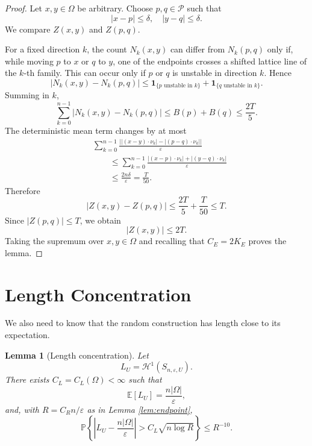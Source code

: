 \documentclass[11pt]{article}
\newtheorem{lemma}[theorem]{Lemma}
\newcommand{\E}{\mathbb E}
\newcommand{\Prob}{\mathbb P}
\newcommand{\cH}{\mathcal H}
\newcommand{\eps}{\varepsilon}
\begin{document}
\begin{proof}
\bigskip
\noindent
Let $x,y\in\Omega$ be arbitrary. Choose $p,q\in\mathcal P$ such that
\[
        |x-p|\le\delta,
        \quad
        |y-q|\le\delta.
\]
We compare $Z(x,y)$ and $Z(p,q)$.

\bigskip
\noindent
For a fixed direction $k$, the count $N_k(x,y)$ can differ from $N_k(p,q)$ only if, while moving $p$ to $x$ or $q$ to $y$, one of the endpoints crosses a shifted lattice line of the $k$-th family. This can occur only if $p$ or $q$ is unstable in direction $k$. Hence
\[
        |N_k(x,y)-N_k(p,q)|
        \le
        \mathbf 1_{\{p\text{ unstable in }k\}}
        +
        \mathbf 1_{\{q\text{ unstable in }k\}}.
\]
Summing in $k$,
\[
        \sum_{k=0}^{n-1}
        |N_k(x,y)-N_k(p,q)|
        \le
        B(p)+B(q)
        \le
        \frac{2T}{5}.
\]
The deterministic mean term changes by at most
\[
\begin{aligned}
        &
        \sum_{k=0}^{n-1}
        \frac{
        \left|
        |(x-y)\cdot\nu_k|
        -
        |(p-q)\cdot\nu_k|
        \right|
        }{\eps}  \\
        &\qquad\le
        \sum_{k=0}^{n-1}
        \frac{
        |(x-p)\cdot\nu_k|+|(y-q)\cdot\nu_k|
        }{\eps}  \\
        &\qquad\le
        \frac{2n\delta}{\eps}
        =
        \frac{T}{50}.
\end{aligned}
\]
Therefore
\[
        |Z(x,y)-Z(p,q)|
        \le
        \frac{2T}{5}+\frac{T}{50}
        \le
        T.
\]
Since $|Z(p,q)|\le T$, we obtain
\[
        |Z(x,y)|\le 2T.
\]
Taking the supremum over $x,y\in\Omega$ and recalling that $C_E=2K_E$ proves the lemma.
\end{proof}

\section{Length Concentration}

We also need to know that the random construction has length close to its expectation.

\begin{lemma}[Length concentration]\label{lem:length}
Let
\[
        L_U=\cH^1(S_{n,\eps,U}).
\]
There exists $C_L=C_L(\Omega)<\infty$ such that
\[
        \E \left[L_U\right]=\frac{n|\Omega|}{\eps},
\]
and, with $R=C_R n/\eps$ as in Lemma \ref{lem:endpoint},
\[
        \Prob\left\{
        \left|
        L_U-\frac{n|\Omega|}{\eps}
        \right|
        >
        C_L\sqrt{n\log R}
        \right\}
        \le
        R^{-10}.
\]
\end{lemma}
\end{document}
